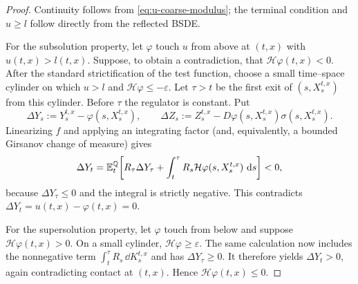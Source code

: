 \begin{proof}
Continuity follows from \eqref{eq:u-coarse-modulus}; the terminal condition
and $u\geq l$ follow directly from the reflected BSDE.

For the subsolution property, let $\varphi$ touch $u$ from above at
$(t,x)$ with $u(t,x)>l(t,x)$. Suppose, to obtain a contradiction, that
$\mathcal H\varphi(t,x)<0$. After the standard strictification of the test
function, choose a small time--space cylinder on which
$u>l$ and $\mathcal H\varphi\leq-\varepsilon$. Let $\tau>t$ be the first exit
of $(s,X_s^{t,x})$ from this cylinder. Before $\tau$ the regulator is
constant. Put
\[
  \Delta Y_s:=Y_s^{t,x}-\varphi(s,X_s^{t,x}),
  \qquad
  \Delta Z_s:=Z_s^{t,x}-D\varphi(s,X_s^{t,x})\sigma(s,X_s^{t,x}).
\]
Linearizing $f$ and applying an integrating factor (and, equivalently, a
bounded Girsanov change of measure) gives
\[
  \Delta Y_t
  =\mathbb E_t^{\mathbb Q}\!\left[
      R_\tau\Delta Y_\tau
      +\int_t^\tau R_s\mathcal H\varphi(s,X_s^{t,x})\,\mathop{}\!\mathrm d s
    \right]<0,
\]
because $\Delta Y_\tau\leq0$ and the integral is strictly negative. This
contradicts $\Delta Y_t=u(t,x)-\varphi(t,x)=0$.

For the supersolution property, let $\varphi$ touch from below and suppose
$\mathcal H\varphi(t,x)>0$. On a small cylinder,
$\mathcal H\varphi\geq\varepsilon$. The same calculation now includes the
nonnegative term
$\int_t^\tau R_s\,\dd K_s^{t,x}$ and has
$\Delta Y_\tau\geq0$. It therefore yields $\Delta Y_t>0$, again contradicting
contact at $(t,x)$. Hence $\mathcal H\varphi(t,x)\leq0$.
\end{proof}
